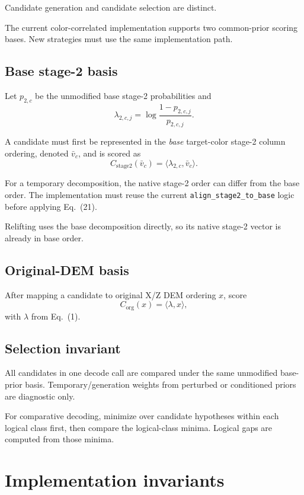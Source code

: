 \documentclass[11pt]{article}
\begin{document}
Candidate generation and candidate selection are distinct.

The current color-correlated implementation supports two common-prior scoring
bases. New strategies must use the same implementation path.

\subsection{Base stage-2 basis}

Let $p_{2,c}$ be the unmodified base stage-2 probabilities and
\[
    \lambda_{2,c,j}
    =
    \log\frac{1-p_{2,c,j}}{p_{2,c,j}}.
    \tag{20}
\]

A candidate must first be represented in the \emph{base} target-color stage-2
column ordering, denoted $\bar v_c$, and is scored as
\[
    C_{\mathrm{stage2}}(\bar v_c)
    =
    \langle\lambda_{2,c},\bar v_c\rangle.
    \tag{21}
\]

For a temporary decomposition, the native stage-2 order can differ from the
base order. The implementation must reuse the current
\texttt{align\_stage2\_to\_base} logic before applying Eq.~(21).

Relifting uses the base decomposition directly, so its native stage-2 vector is
already in base order.

\subsection{Original-DEM basis}

After mapping a candidate to original X/Z DEM ordering $x$, score
\[
    C_{\mathrm{org}}(x)
    =
    \langle\lambda,x\rangle,
    \tag{22}
\]
with $\lambda$ from Eq.~(1).

\subsection{Selection invariant}

All candidates in one decode call are compared under the same unmodified
base-prior basis. Temporary/generation weights from perturbed or conditioned
priors are diagnostic only.

For comparative decoding, minimize over candidate hypotheses within each
logical class first, then compare the logical-class minima. Logical gaps are
computed from those minima.

\section{Implementation invariants}
\end{document}
